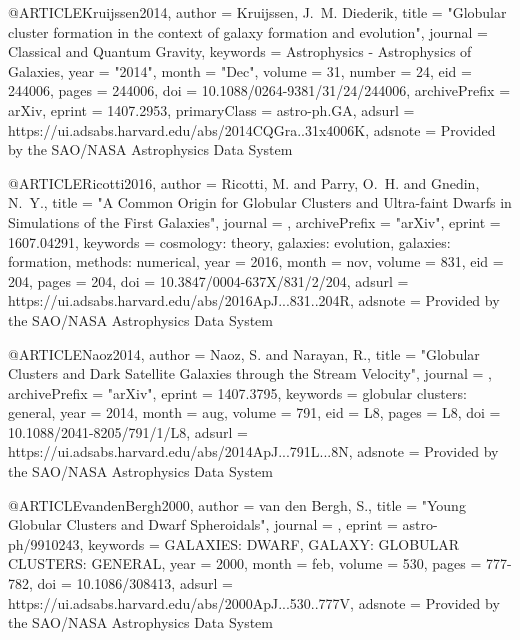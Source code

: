 \documentclass[apj]{emulateapj}
\begin{document}
{{{{@ARTICLE{Kruijssen2014,
       author = {{Kruijssen}, J.~M. Diederik},
        title = "{Globular cluster formation in the context of galaxy formation and evolution}",
      journal = {Classical and Quantum Gravity},
     keywords = {Astrophysics - Astrophysics of Galaxies},
         year = "2014",
        month = "Dec",
       volume = {31},
       number = {24},
          eid = {244006},
        pages = {244006},
          doi = {10.1088/0264-9381/31/24/244006},
archivePrefix = {arXiv},
       eprint = {1407.2953},
 primaryClass = {astro-ph.GA},
       adsurl = {https://ui.adsabs.harvard.edu/abs/2014CQGra..31x4006K},
      adsnote = {Provided by the SAO/NASA Astrophysics Data System}
}




@ARTICLE{Ricotti2016,
   author = {{Ricotti}, M. and {Parry}, O.~H. and {Gnedin}, N.~Y.},
    title = "{A Common Origin for Globular Clusters and Ultra-faint Dwarfs in Simulations of the First Galaxies}",
  journal = {\apj},
archivePrefix = "arXiv",
   eprint = {1607.04291},
 keywords = {cosmology: theory, galaxies: evolution, galaxies: formation, methods: numerical},
     year = 2016,
    month = nov,
   volume = 831,
      eid = {204},
    pages = {204},
      doi = {10.3847/0004-637X/831/2/204},
   adsurl = {https://ui.adsabs.harvard.edu/abs/2016ApJ...831..204R},
  adsnote = {Provided by the SAO/NASA Astrophysics Data System}
}




@ARTICLE{Naoz2014,
   author = {{Naoz}, S. and {Narayan}, R.},
    title = "{Globular Clusters and Dark Satellite Galaxies through the Stream Velocity}",
  journal = {\apjl},
archivePrefix = "arXiv",
   eprint = {1407.3795},
 keywords = {globular clusters: general},
     year = 2014,
    month = aug,
   volume = 791,
      eid = {L8},
    pages = {L8},
      doi = {10.1088/2041-8205/791/1/L8},
   adsurl = {https://ui.adsabs.harvard.edu/abs/2014ApJ...791L...8N},
  adsnote = {Provided by the SAO/NASA Astrophysics Data System}
}




@ARTICLE{vandenBergh2000,
   author = {{van den Bergh}, S.},
    title = "{Young Globular Clusters and Dwarf Spheroidals}",
  journal = {\apj},
   eprint = {astro-ph/9910243},
 keywords = {GALAXIES: DWARF, GALAXY: GLOBULAR CLUSTERS: GENERAL},
     year = 2000,
    month = feb,
   volume = 530,
    pages = {777-782},
      doi = {10.1086/308413},
   adsurl = {https://ui.adsabs.harvard.edu/abs/2000ApJ...530..777V},
  adsnote = {Provided by the SAO/NASA Astrophysics Data System}
}





}}}}
\end{document}
